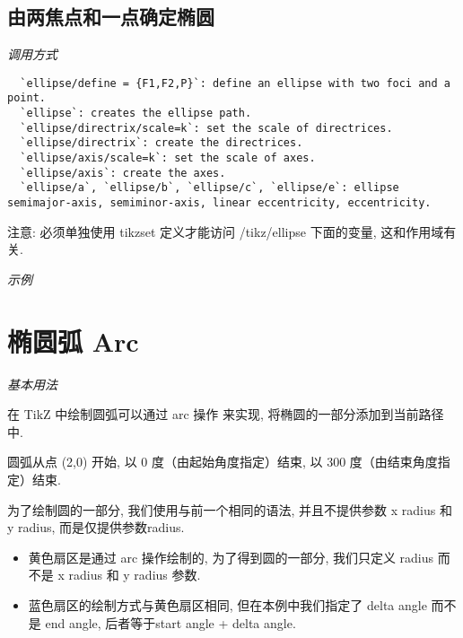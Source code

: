 \subsection{由两焦点和一点确定椭圆}

\emph{调用方式}

\begin{verbatim}
  `ellipse/define = {F1,F2,P}`: define an ellipse with two foci and a point.
  `ellipse`: creates the ellipse path.
  `ellipse/directrix/scale=k`: set the scale of directrices.
  `ellipse/directrix`: create the directrices.
  `ellipse/axis/scale=k`: set the scale of axes.
  `ellipse/axis`: create the axes.
  `ellipse/a`, `ellipse/b`, `ellipse/c`, `ellipse/e`: ellipse semimajor-axis, semiminor-axis, linear eccentricity, eccentricity.
\end{verbatim}

注意:  必须单独使用 tikzset 定义才能访问 /tikz/ellipse 下面的变量, 这和作用域有关.

\emph{示例}


\section{椭圆弧 Arc}

\emph{基本用法}

在 TikZ 中绘制圆弧可以通过 arc 操作 来实现, 将椭圆的一部分添加到当前路径中.


圆弧从点 (2,0) 开始, 以 0 度（由起始角度指定）结束, 以 300 度（由结束角度指定）结束.

为了绘制圆的一部分, 我们使用与前一个相同的语法, 并且不提供参数 x radius 和 y radius, 而是仅提供参数radius.


\begin{itemize}

\item 黄色扇区是通过 arc 操作绘制的, 为了得到圆的一部分, 我们只定义 radius 而不是  x radius 和 y radius 参数. 

\item 蓝色扇区的绘制方式与黄色扇区相同, 但在本例中我们指定了 delta angle 而不是 end angle, 后者等于start angle + delta angle.

\end{itemize}

